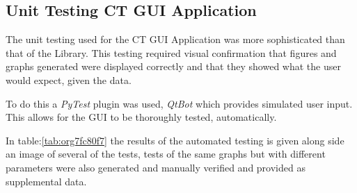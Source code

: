 \documentclass[11pt]{report}
\begin{document}
\clearpage

\subsection{Unit Testing CT GUI Application}
\label{sec:org3ffd5c0}

The unit testing used for the CT GUI Application was more sophisticated than that of the Library. This testing required visual confirmation that figures and graphs generated were displayed correctly and that they showed what the user would expect, given the data.

To do this a \emph{PyTest} plugin was used, \emph{QtBot} which provides simulated user input. This allows for the GUI to be thoroughly tested, automatically.

In table:\ref{tab:org7fc80f7} the results of the automated testing is given along side an image of several of the tests, tests of the same graphs but with different parameters were also generated and manually verified and provided as supplemental data.
\end{document}
